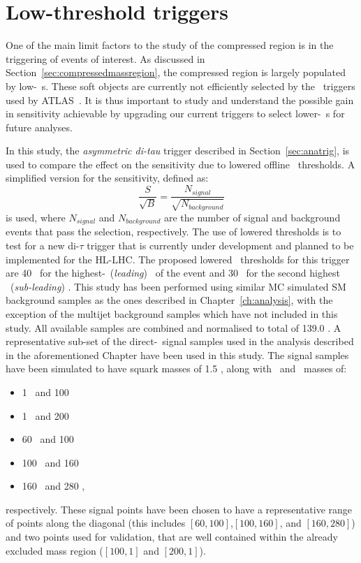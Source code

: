 	\section{Low-threshold triggers}
	\label{sec:lowthresholdtriggers}
	One of the main limit factors to the study of the compressed region is in the triggering of events of interest. As discussed in Section~\ref{sec:compressedmassregion}, the compressed region is largely populated by low-\pt\ \ltau s. 
	These soft objects are currently not efficiently selected by the \ltau\ triggers used by \ac{ATLAS}~\cite{ATLAS-CONF-2017-061}. 
	 It is thus important to study and understand the possible gain in sensitivity achievable by upgrading our current triggers to select lower-\pt\ \ltau s for future analyses.
	 
	 In this study, the \textit{asymmetric di-tau} trigger described in Section~\ref{sec:anatrig}, is used to compare the effect on the sensitivity due to lowered offline \pt\ thresholds.
	  A simplified version for the sensitivity, defined as:
	  \begin{equation}
	  \frac{S}{\sqrt{B}}=\frac{N_{signal}}{\sqrt{N_{background}}}
	  \end{equation}
	  is used, where $N_{signal}$ and $N_{background}$ are the number of signal and background events that pass the selection, respectively.
	  The use of lowered thresholds is to test for a new di-$\tau$ trigger that is currently under development and planned to be implemented for the \ac{HL-LHC}. 
	 The proposed lowered \pt\ thresholds for this trigger are 40 \gev\ for the highest-\pt\ (\textit{leading}) \ltau\ of the event and 30 \gev\ for the second highest \pt\ (\textit{sub-leading}) \ltau.
	 This study has been performed using similar \ac{MC} simulated \ac{SM} background samples as the ones described in Chapter~\ref{ch:analysis}, with the exception of the multijet background samples which have not included in this study.
	 All available samples are combined and normalised to total of 139.0 \infb.
	 A representative sub-set of the direct-\stau\ signal samples used in the analysis described in the aforementioned Chapter have been used in this study. 
	 The signal samples have been simulated to have squark masses of 1.5 \tev, along with \ninoone\ and \stau\ masses of:
	 \begin{itemize}
	 \item 1 \gev\ and 100 \gev\
	 \item 1 \gev\ and 200 \gev\
	 \item 60 \gev\ and 100 \gev\
	 \item 100 \gev\ and 160 \gev\
	 \item 160 \gev\ and 280 \gev,
	\end{itemize}
	respectively. 
	These signal points have been chosen to have a representative range of points along the diagonal (this includes $[60,100]$,$[100,160]$, and $[160,280]$) and two  points used for validation, that are well contained within the already excluded mass region ($[100,1]$ and $[200,1]$).
	

